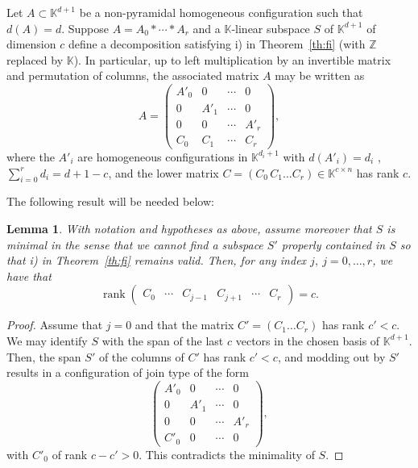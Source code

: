 \documentclass[11pt]{amsart}
\theoremstyle{plain}
\newtheorem{lemma}[theorem]{Lemma}
\theoremstyle{definition}
\theoremstyle{remark}
\newcommand{\rank}{\operatorname{rank}}
\newcommand{\baseRing}[1]{\ensuremath{\mathbb{#1}}}
\newcommand{\Z}{\baseRing{Z}}
\newcommand{\beq}{\begin{equation}}
\newcommand{\eeq}{\end{equation}}
\renewcommand{\k}{{\mathbb K}}
\numberwithin{equation}{section}
\begin{document}
 Let $A \subset  \k^{d+1}$ be a non-pyramidal 
homogeneous configuration such that $d(A) = d$. Suppose $A = A_0 \ast \cdots \ast A_r$ and a $\k$-linear subspace $S$ 
 of $\k^{d+1}$ of dimension $c$ define a decomposition satisfying i) in Theorem~\ref{th:fi} (with $\Z$ replaced by $\k$).
In particular, up to left multiplication by an invertible matrix and permutation of columns, the associated matrix $A$ may be written as 
\begin{equation}
\label{eq:matrixCclower}
 A = \left(\begin{array}{cccc}
A'_0& { 0} & \cdots & { 0}\\
{ 0}  & A'_1 & \cdots & { 0}  \\
{0}  & { 0}  & \cdots & A'_r \\
C_0& C_1 &\cdots & C_r
\end{array}\right),
\end{equation}
where the $A'_i$ are homogeneous configurations in 
$\k^{d_i+1}$  with $d(A'_i)=d_i$ , $\sum_{i=0}^r d_i = d+1-c$,  and the lower matrix $C = (C_0\,  C_1 \dots C_r) \in \k^{c \times n}$  has rank $c$.  
 
 The following result will be needed below:
 
\begin{lemma}\label{lemma:cbarc}
With notation and hypotheses as above, assume moreover that $S$ is minimal in the sense that we cannot find a subspace $S'$ properly contained in $S$ so that  i)  in Theorem~\ref{th:fi} remains valid.
Then, for any index $j, \ j=0,\dots,r$, we have that
\beq\label{eq:cbarc}
\rank\left(\begin{array}{cccccc}C_0 & \cdots & C_{j-1} & C_{j+1} & \cdots & C_r\end{array}\right) = c.
\eeq
\end{lemma}

\begin{proof} 
Assume that $j=0$ and that the matrix $C'= (C_1 \dots C_r)$ has rank $c'<c$.  We may identify $S$ with 
the span of the last $c$ vectors in the chosen basis of $\k^{d+1}$. 
Then, the span $S'$  of the columns of $C'$ has rank $c'<c$, and modding out by $S'$ results in a configuration of join type of the form
\begin{equation}
\label{eq:matrixCclower2}
 \left(\begin{array}{cccc}
A'_0& { 0} & \cdots & { 0}\\
{ 0}  & A'_1 & \cdots & { 0}  \\
{0}  & { 0}  & \cdots & A'_r \\
C'_0& 0 &\cdots & 0
\end{array}\right),
\end{equation}
with $C'_0$ of rank $c-c'>0$. This contradicts the minimality of $S$.
\end{proof}
\end{document}
